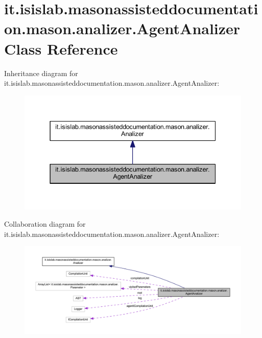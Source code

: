 \hypertarget{classit_1_1isislab_1_1masonassisteddocumentation_1_1mason_1_1analizer_1_1_agent_analizer}{\section{it.\-isislab.\-masonassisteddocumentation.\-mason.\-analizer.\-Agent\-Analizer Class Reference}
\label{classit_1_1isislab_1_1masonassisteddocumentation_1_1mason_1_1analizer_1_1_agent_analizer}
}


Inheritance diagram for it.\-isislab.\-masonassisteddocumentation.\-mason.\-analizer.\-Agent\-Analizer\-:
\nopagebreak
\begin{figure}[H]
\begin{center}
\leavevmode
\includegraphics[width=337pt]{classit_1_1isislab_1_1masonassisteddocumentation_1_1mason_1_1analizer_1_1_agent_analizer__inherit__graph}
\end{center}
\end{figure}


Collaboration diagram for it.\-isislab.\-masonassisteddocumentation.\-mason.\-analizer.\-Agent\-Analizer\-:
\nopagebreak
\begin{figure}[H]
\begin{center}
\leavevmode
\includegraphics[width=350pt]{classit_1_1isislab_1_1masonassisteddocumentation_1_1mason_1_1analizer_1_1_agent_analizer__coll__graph}
\end{center}
\end{figure}
